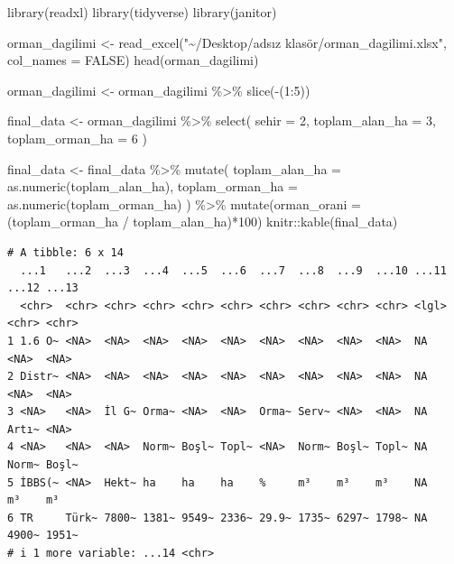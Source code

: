 \documentclass[
  11pt,
  a4paper,
  DIV=11,
  numbers=noendperiod]{scrartcl}
\newenvironment{Shaded}{\begin{snugshade}}{\end{snugshade}}
\newcommand{\AttributeTok}[1]{\textcolor[rgb]{0.40,0.45,0.13}{#1}}
\newcommand{\ConstantTok}[1]{\textcolor[rgb]{0.56,0.35,0.01}{#1}}
\newcommand{\DecValTok}[1]{\textcolor[rgb]{0.68,0.00,0.00}{#1}}
\newcommand{\FunctionTok}[1]{\textcolor[rgb]{0.28,0.35,0.67}{#1}}
\newcommand{\NormalTok}[1]{\textcolor[rgb]{0.00,0.23,0.31}{#1}}
\newcommand{\OtherTok}[1]{\textcolor[rgb]{0.00,0.23,0.31}{#1}}
\newcommand{\SpecialCharTok}[1]{\textcolor[rgb]{0.37,0.37,0.37}{#1}}
\newcommand{\StringTok}[1]{\textcolor[rgb]{0.13,0.47,0.30}{#1}}
\begin{document}
\begin{Shaded}
\begin{Highlighting}[]
\FunctionTok{library}\NormalTok{(readxl)}
\FunctionTok{library}\NormalTok{(tidyverse)}
\FunctionTok{library}\NormalTok{(janitor)}

\NormalTok{orman\_dagilimi }\OtherTok{\textless{}{-}} \FunctionTok{read\_excel}\NormalTok{(}\StringTok{"\textasciitilde{}/Desktop/adsız klasör/orman\_dagilimi.xlsx"}\NormalTok{, }
    \AttributeTok{col\_names =} \ConstantTok{FALSE}\NormalTok{)}
\FunctionTok{head}\NormalTok{(orman\_dagilimi)}

\NormalTok{orman\_dagilimi }\OtherTok{\textless{}{-}}\NormalTok{ orman\_dagilimi }\SpecialCharTok{\%\textgreater{}\%} 
  \FunctionTok{slice}\NormalTok{(}\SpecialCharTok{{-}}\NormalTok{(}\DecValTok{1}\SpecialCharTok{:}\DecValTok{5}\NormalTok{))}

\NormalTok{final\_data }\OtherTok{\textless{}{-}}\NormalTok{ orman\_dagilimi }\SpecialCharTok{\%\textgreater{}\%}
  \FunctionTok{select}\NormalTok{(}
    \AttributeTok{sehir =} \DecValTok{2}\NormalTok{, }
    \AttributeTok{toplam\_alan\_ha =} \DecValTok{3}\NormalTok{, }
    \AttributeTok{toplam\_orman\_ha =} \DecValTok{6}
\NormalTok{  )}

\NormalTok{final\_data }\OtherTok{\textless{}{-}}\NormalTok{ final\_data }\SpecialCharTok{\%\textgreater{}\%}
  \FunctionTok{mutate}\NormalTok{(}
    \AttributeTok{toplam\_alan\_ha =} \FunctionTok{as.numeric}\NormalTok{(toplam\_alan\_ha),}
    \AttributeTok{toplam\_orman\_ha =} \FunctionTok{as.numeric}\NormalTok{(toplam\_orman\_ha)}
\NormalTok{  ) }\SpecialCharTok{\%\textgreater{}\%}
  \FunctionTok{mutate}\NormalTok{(}\AttributeTok{orman\_orani =}\NormalTok{ (toplam\_orman\_ha }\SpecialCharTok{/}\NormalTok{ toplam\_alan\_ha)}\SpecialCharTok{*}\DecValTok{100}\NormalTok{)}
\NormalTok{knitr}\SpecialCharTok{::}\FunctionTok{kable}\NormalTok{(final\_data)}
\end{Highlighting}
\end{Shaded}

\begin{verbatim}
# A tibble: 6 x 14
  ...1   ...2  ...3  ...4  ...5  ...6  ...7  ...8  ...9  ...10 ...11 ...12 ...13
  <chr>  <chr> <chr> <chr> <chr> <chr> <chr> <chr> <chr> <chr> <lgl> <chr> <chr>
1 1.6 O~ <NA>  <NA>  <NA>  <NA>  <NA>  <NA>  <NA>  <NA>  <NA>  NA    <NA>  <NA> 
2 Distr~ <NA>  <NA>  <NA>  <NA>  <NA>  <NA>  <NA>  <NA>  <NA>  NA    <NA>  <NA> 
3 <NA>   <NA>  İl G~ Orma~ <NA>  <NA>  Orma~ Serv~ <NA>  <NA>  NA    Artı~ <NA> 
4 <NA>   <NA>  <NA>  Norm~ Boşl~ Topl~ <NA>  Norm~ Boşl~ Topl~ NA    Norm~ Boşl~
5 İBBS(~ <NA>  Hekt~ ha    ha    ha    %     m³    m³    m³    NA    m³    m³   
6 TR     Türk~ 7800~ 1381~ 9549~ 2336~ 29.9~ 1735~ 6297~ 1798~ NA    4900~ 1951~
# i 1 more variable: ...14 <chr>
\end{verbatim}
\end{document}
